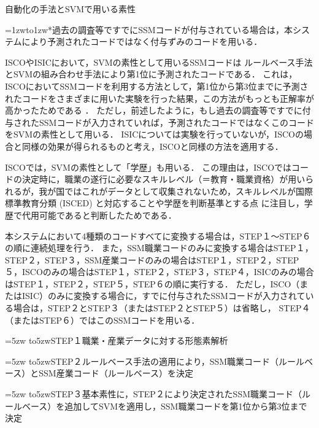 \documentclass[japanese]{jnlp_1.4}
\begin{document}
\begin{table}[t]
\caption{自動化の手法とSVMで用いる素性}
\label{table4}

\vspace{4pt}\hangindent=1zw\leavevmode\hbox to1zw{*}過去の調査等ですでにSSMコードが付与されている場合は，本システムにより予測されたコードではなく付与ずみのコードを用いる．
\end{table}

ISCOやISICにおいて，SVMの素性として用いるSSMコードは ルールベース手法とSVMの組み合わせ手法により第1位に予測されたコードである．
これは，ISCOにおいてSSMコードを利用する方法として，第1位から第3位までに予測されたコードをさまざまに用いた実験を行った結果，この方法がもっとも正解率が高かったためである \cite{Takahashi08}．
ただし，前述したように，もし過去の調査等ですでに付与されたSSMコードが入力されていれば，予測されたコードではなくこのコードをSVMの素性として用いる．
ISICについては実験を行っていないが，ISCOの場合と同様の効果が得られるものと考え，ISCOと同様の方法を適用する．

ISCOでは，SVMの素性として「学歴」も用いる．
この理由は，ISCOではコードの決定時に，職業の遂行に必要なスキルレベル（＝教育・職業資格）が用いられるが，我が国ではこれがデータとして収集されないため，スキルレベルが国際標準教育分類 (ISCED) と対応することや学歴を判断基準とする点 \cite{Tanabe08}に注目し，学歴で代用可能であると判断したためである． 

本システムにおいて4種類のコードすべてに変換する場合は，STEP１〜STEP６の順に連続処理を行う．
また，SSM職業コードのみに変換する場合はSTEP１，STEP２，STEP３，SSM産業コードのみの場合はSTEP１，STEP２，STEP５，ISCOのみの場合はSTEP１，STEP２，STEP３，STEP４，ISICのみの場合はSTEP１，STEP２，STEP５，STEP６の順に実行する．
ただし，ISCO（またはISIC）のみに変換する場合に，すでに付与されたSSMコードが入力されている場合は，STEP２とSTEP３（またはSTEP２とSTEP５）は省略し， STEP４（またはSTEP６）ではこのSSMコードを用いる．

\vspace{1\Cvs}
\hangindent=5zw
\noindent\hbox to5zw{STEP１\hss}職業・産業データに対する形態素解析

\hangindent=5zw
\noindent\hbox to5zw{STEP２\hss}ルールベース手法の適用により，SSM職業コード（ルールベース）とSSM産業コード（ルールベース）を決定

\hangindent=5zw
\noindent\hbox to5zw{STEP３\hss}基本素性に，STEP２により決定されたSSM職業コード（ルールベース）を追加してSVMを適用し，SSM職業コードを第1位から第3位まで決定
\end{document}
